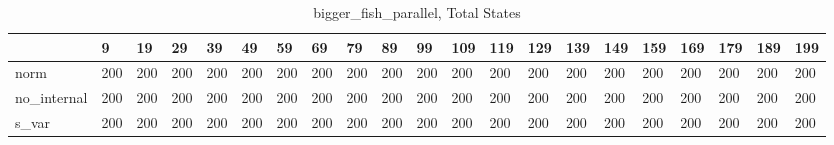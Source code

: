 \begin{table}
\centering
\caption{bigger_fish_parallel, Total States}
\label{bigger_fish_parallel_total}
\begin{tabular}{lllllllllllllllllllll}
\toprule
{} &    9 &   19 &   29 &   39 &   49 &   59 &   69 &   79 &   89 &   99 &  109 &  119 &  129 &  139 &  149 &  159 &  169 &  179 &  189 &  199 \\
\midrule
norm        &  200 &  200 &  200 &  200 &  200 &  200 &  200 &  200 &  200 &  200 &  200 &  200 &  200 &  200 &  200 &  200 &  200 &  200 &  200 &  200 \\
no\_internal &  200 &  200 &  200 &  200 &  200 &  200 &  200 &  200 &  200 &  200 &  200 &  200 &  200 &  200 &  200 &  200 &  200 &  200 &  200 &  200 \\
s\_var       &  200 &  200 &  200 &  200 &  200 &  200 &  200 &  200 &  200 &  200 &  200 &  200 &  200 &  200 &  200 &  200 &  200 &  200 &  200 &  200 \\
\bottomrule
\end{tabular}
\end{table}
